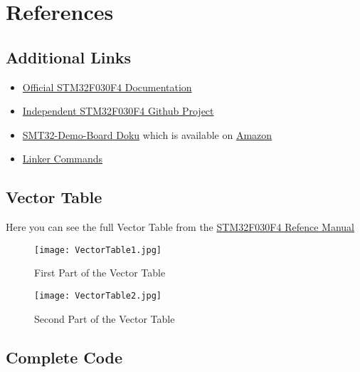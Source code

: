 \section{References}
\label{sec:References}

\subsection{Additional Links}

\begin{itemize}
	\item \href{https://www.st.com/en/microcontrollers-microprocessors/stm32f030f4.html#documentation}{Official STM32F030F4 Documentation}
	\item \href{https://github.com/dwelch67/stm32_samples/blob/master/STM32F030F4P6}{Independent STM32F030F4 Github Project}
	\item \href{https://stm32-base.org/boards/STM32F030F4P6-STM32F030-DEMO-BOARD-V1.1}{SMT32-Demo-Board Doku} which is available on \href{https://www.amazon.de/gp/product/B07JLD4M8K/ref=ppx_yo_dt_b_asin_title_o02_s00?ie=UTF8&psc=1}{Amazon}
	\item \href{http://osr507doc.sco.com/en/tools/ld_cmd_lang_sections.html#ld_cmd_lang_sections_grouping}{Linker Commands}
\end{itemize}


\subsection{Vector Table}
\label{fig:VecTab}

Here you can see the full Vector Table from the \href{https://www.st.com/resource/en/reference_manual/dm00091010-stm32f030x4x6x8xc-and-stm32f070x6xb-advanced-armbased-32bit-mcus-stmicroelectronics.pdf}{STM32F030F4 Refence Manual}

\begin{figure}
	\texttt{[image: VectorTable1.jpg]}
	\caption{First Part of the Vector Table}
	\label{fig:VecTab1}
\end{figure}

\begin{figure}
	\texttt{[image: VectorTable2.jpg]}
	\caption{Second Part of the Vector Table}
	\label{fig:VecTab2}
\end{figure}

\subsection{Complete Code}
\label{subsec:CompCodeRef}


